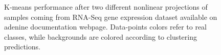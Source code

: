 \documentclass[twoside,11pt]{article}
\makeatletter
\newcommand{\ade}{{\sc adenine}\@\xspace}
\makeatother
\begin{document}
\begin{figure}[]
    \centering
    \hfill%
\caption{\small K-means performance after two different nonlinear projections of samples coming from RNA-Seq gene expression dataset available on \ade documentation webpage. Data-points colors refer to real classes, while backgrounds are colored according to clustering predictions.}\label{fig:scatter}
\end{figure}



\newpage

\end{document}
